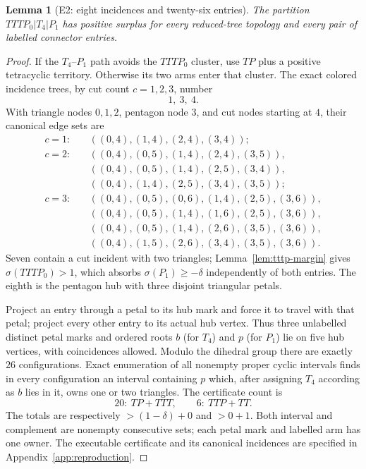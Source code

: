 \documentclass[11pt]{article}
\newtheorem{lemma}[theorem]{Lemma}
\newcommand{\sig}{\sigma}
\begin{document}
\begin{lemma}[E2: eight incidences and twenty-six entries]\label{lem:e2}
The partition $TTTP_0|T_4|P_1$ has positive surplus for every reduced-tree
topology and every pair of labelled connector entries.
\end{lemma}
\begin{proof}
If the $T_4$--$P_1$ path avoids the $TTTP_0$ cluster, use $TP$ plus a positive
tetracyclic territory.  Otherwise its two arms enter that cluster.  The exact
colored incidence trees, by cut count $c=1,2,3$, number
\[
 1,\ 3,\ 4.
\]
With triangle nodes $0,1,2$, pentagon node $3$, and cut nodes starting at $4$,
their canonical edge sets are
\begin{align*}
c=1:\quad&((0,4),(1,4),(2,4),(3,4));\\
c=2:\quad&((0,4),(0,5),(1,4),(2,4),(3,5)),\\
&((0,4),(0,5),(1,4),(2,5),(3,4)),\\
&((0,4),(1,4),(2,5),(3,4),(3,5));\\
c=3:\quad&((0,4),(0,5),(0,6),(1,4),(2,5),(3,6)),\\
&((0,4),(0,5),(1,4),(1,6),(2,5),(3,6)),\\
&((0,4),(0,5),(1,4),(2,6),(3,5),(3,6)),\\
&((0,4),(1,5),(2,6),(3,4),(3,5),(3,6)).
\end{align*}
Seven contain a cut incident with two triangles; Lemma~\ref{lem:tttp-margin} gives
$\sig(TTTP_0)>1$, which absorbs $\sig(P_1)\geq-\delta$ independently of both
entries.  The eighth is the pentagon hub with three disjoint triangular petals.

Project an entry through a petal to its hub mark and force it to travel with
that petal; project every other entry to its actual hub vertex.  Thus three
unlabelled distinct petal marks and ordered roots $b$ (for $T_4$) and $p$ (for
$P_1$) lie on five hub vertices, with coincidences allowed.  Modulo the
dihedral group there are exactly $26$ configurations.  Exact enumeration of
all nonempty proper cyclic intervals finds in every configuration an interval
containing $p$ which, after assigning $T_4$ according as $b$ lies in it, owns
one or two triangles.  The certificate count is
\[
 20:\ TP+TTT,
 \qquad 6:\ TTP+TT.
\]
The totals are respectively $>(1-\delta)+0$ and $>0+1$.  Both interval and
complement are nonempty consecutive sets; each petal mark and labelled arm has
one owner.  The executable certificate and its canonical incidences are
specified in Appendix~\ref{app:reproduction}.
\end{proof}
\end{document}
